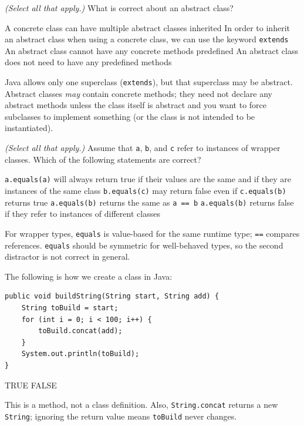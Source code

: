 \question[4]
\textit{(Select all that apply.)} What is correct about an abstract class?
\begin{checkboxes}
  \choice A concrete class can have multiple abstract classes inherited
  \CorrectChoice In order to inherit an abstract class when using a concrete class, we can use the keyword \texttt{extends}
  \choice An abstract class cannot have any concrete methods predefined
  \CorrectChoice An abstract class does not need to have any predefined methods
\end{checkboxes}
\begin{solution}
  Java allows only one superclass (\texttt{extends}), but that superclass may be abstract. Abstract classes \emph{may} contain concrete methods; they need not declare any abstract methods unless the class itself is abstract and you want to force subclasses to implement something (or the class is not intended to be instantiated).
\end{solution}

\question[4]
\textit{(Select all that apply.)} Assume that \texttt{a}, \texttt{b}, and \texttt{c} refer to instances of wrapper classes. Which of the following statements are correct?
\begin{checkboxes}
  \CorrectChoice \texttt{a.equals(a)} will always return true if their values are the same and if they are instances of the same class
  \choice \texttt{b.equals(c)} may return false even if \texttt{c.equals(b)} returns true
  \choice \texttt{a.equals(b)} returns the same as \texttt{a == b}
  \CorrectChoice \texttt{a.equals(b)} returns false if they refer to instances of different classes
\end{checkboxes}
\begin{solution}
  For wrapper types, \texttt{equals} is value-based for the same runtime type; \texttt{==} compares references. \texttt{equals} should be symmetric for well-behaved types, so the second distractor is not correct in general.
\end{solution}

\question[4]
The following is how we create a class in Java:
\begin{lstlisting}[style=java]
public void buildString(String start, String add) {
    String toBuild = start;
    for (int i = 0; i < 100; i++) {
        toBuild.concat(add);
    }
    System.out.println(toBuild);
}
\end{lstlisting}
\begin{choices}
  \choice TRUE
  \CorrectChoice FALSE
\end{choices}
\begin{solution}
  This is a method, not a class definition. Also, \texttt{String.concat} returns a new \texttt{String}; ignoring the return value means \texttt{toBuild} never changes.
\end{solution}

